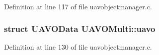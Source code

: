 Definition at line 117 of file uavobjectmanager.\-c.

\hypertarget{group___u_a_v_ga718e24f6eadeb8508309dcb0eeeb9bda}{
\subsubsection[{uavo}]{\setlength{\rightskip}{0pt plus 5cm}struct {\bf U\-A\-V\-O\-Data} U\-A\-V\-O\-Multi\-::uavo}}\label{group___u_a_v_ga718e24f6eadeb8508309dcb0eeeb9bda}


Definition at line 130 of file uavobjectmanager.\-c.

